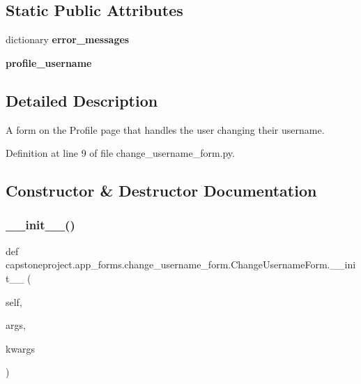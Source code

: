 \subsection*{Static Public Attributes}
\begin{DoxyCompactItemize}
\item 
dictionary {\bfseries error\+\_\+messages}
\item 
{\bfseries profile\+\_\+username}
\end{DoxyCompactItemize}


\subsection{Detailed Description}
\begin{DoxyVerb}A form on the Profile page that handles the user changing their username.
\end{DoxyVerb}
 

Definition at line 9 of file change\+\_\+username\+\_\+form.\+py.



\subsection{Constructor \& Destructor Documentation}
\mbox{\label{classcapstoneproject_1_1app__forms_1_1change__username__form_1_1_change_username_form_af257301620a3acf3d4fbaaa99e3f323a}} 
\subsubsection{\texorpdfstring{\+\_\+\+\_\+init\+\_\+\+\_\+()}{\_\_init\_\_()}}
{\footnotesize\ttfamily def capstoneproject.\+app\+\_\+forms.\+change\+\_\+username\+\_\+form.\+Change\+Username\+Form.\+\_\+\+\_\+init\+\_\+\+\_\+ (\begin{DoxyParamCaption}\item[{}]{self,  }\item[{}]{args,  }\item[{}]{kwargs }\end{DoxyParamCaption})}

